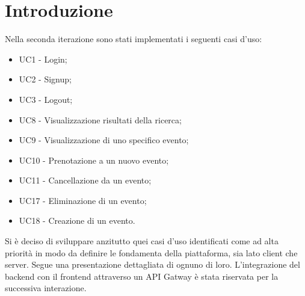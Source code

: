 \section{Introduzione}
Nella seconda iterazione sono stati implementati i seguenti casi d'uso:
\begin{itemize}
	\item UC1 - Login;
	\item UC2 - Signup;
	\item UC3 - Logout;
	\item UC8 - Visualizzazione risultati della ricerca;
	\item UC9 - Visualizzazione di uno specifico evento;
	\item UC10 - Prenotazione a un nuovo evento;
	\item UC11 - Cancellazione da un evento;
	\item UC17 - Eliminazione di un evento;
	\item UC18 - Creazione di un evento.
\end{itemize}
Si è deciso di sviluppare anzitutto quei casi d'uso identificati come ad alta priorità in modo da definire le fondamenta della piattaforma, sia lato client che server. Segue una presentazione dettagliata di ognuno di loro.
L'integrazione del backend con il frontend attraverso un API Gatway è stata riservata per la successiva interazione.
